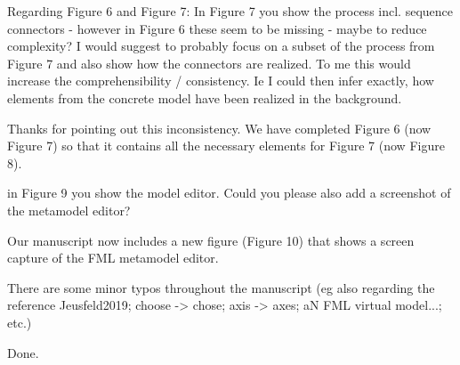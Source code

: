 \documentclass[10pt]{article}
\begin{document}
\begin{response}{Regarding Figure 6 and Figure 7: In Figure 7 you show the process incl. sequence connectors - however in Figure 6 these seem to be missing - maybe to reduce complexity? I would suggest to probably focus on a subset of the process from Figure 7 and also show how the connectors are realized. To me this would increase the comprehensibility / consistency. Ie I could then infer exactly, how elements from the concrete model have been realized in the background.}

Thanks for pointing out this inconsistency. We have completed Figure 6 (now Figure 7) so that it contains all the necessary elements for Figure 7 (now Figure 8).


\end{response}

\begin{response}{in Figure 9 you show the model editor. Could you please also add a screenshot of the metamodel editor?}

Our manuscript now includes a new figure (Figure 10) that shows a screen capture of the FML metamodel editor.%
\end{response}

\begin{response}{There are some minor typos throughout the manuscript (eg also regarding the reference Jeusfeld2019; choose -> chose; axis -> axes; aN FML virtual model...; etc.)}

Done.
\end{response}


\pagebreak

\end{document}
